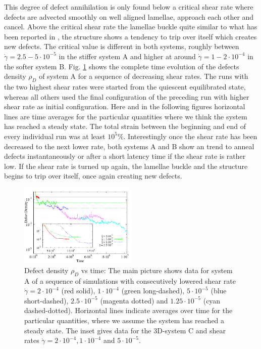 \documentclass[8.5pt,twoside,twocolumn]{article}
\newcommand{\e}[1]{\cdot10^{#1}}
\begin{document}
This degree of defect annihilation is only found below a critical shear rate where defects are advected smoothly on well aligned lamellae, approach each other and cancel.
Above the critical shear rate the lamellae buckle quite similar to what has been reported in \cite{Gonnella98}, the structure shows a tendency to trip over itself which creates new defects.
The critical value is different in both systems, roughly between $\dot{\gamma}=2.5-5\e{-5}$ in the stiffer system A and higher at around $\dot{\gamma}=1-2\e{-4}$ in the softer system B.
Fig. \ref{fig6} shows the  complete time evolution of the defects density $\rho_D$ of system A for a sequence of decreasing shear rates.
The runs with the two highest shear rates were started from the quiescent equilibrated state, whereas all others used the final configuration of the preceding run with higher shear rate as initial configuration.
Here and in the following figures horizontal lines are time averages for the particular quantities where we think the system has reached a steady state. 
The total strain between the beginning and end of every individual run was at least $10^{5}\%$.
Interestingly once the shear rate has been decreased to the next lower rate, both systems A and B show an trend to anneal defects instantaneously or after a short latency time if the shear rate is rather low.
If the shear rate is turned up again, the lamellae buckle and the structure begins to trip over itself, once again creating new defects.
\begin{figure}[!]
\centering
\includegraphics[angle=0,width=0.5\textwidth]{defect_density_5e-4.pdf}
\caption{Defect density $\rho_D$ vs time: The main picture shows data for system A of a sequence of simulations with consecutively lowered shear rate $\dot{\gamma}=2\e{-4}$ (red solid), $1\e{-4}$ (green long-dashed),  $5\e{-5}$ (blue short-dashed),  $2.5\e{-5}$ (magenta dotted) and  $1.25\e{-5}$ (cyan dashed-dotted). Horizontal lines indicate averages over time for the particular quantities, where we assume the system has reached a steady state. The inset gives data for the 3D-system C and shear rates $\dot{\gamma}=2\cdot10^{-4}, 1\cdot10^{-4}$ and $5\cdot10^{-5}$.} 
\label{fig6}
\end{figure}
\end{document}

